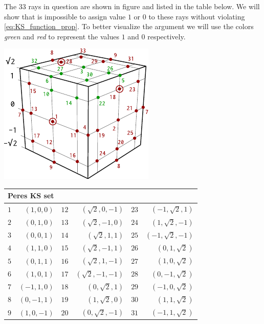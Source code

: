 \documentclass[a4paper]{article}
\theoremstyle{definition}
\let\oldproof\proof
\let\oldendproof\endproof
\renewenvironment{proof}
    {
        \begin{framed} 
        \oldproof
    }
    {
        \oldendproof 
        \end{framed}
    }
\begin{document}
\begin{proof}
    The 33 rays in question are shown in figure and listed in the table below.
    We will show that is impossible to assign value $1$ or $0$ to these rays
    without violating \eqref{eq:KS_function_prop}.
    To better visualize the argument we will use the colors \emph{green} and
    \emph{red} to represent the values $1$ and $0$ respectively.

    \begin{center}
        \includegraphics[scale=1.5]{KS33cube.pdf} \\
    \end{center}
    \begin{center}
    \begin{tabular}{lrlrlr}
        \multicolumn{2}{l}{Peres KS set} \\
        \toprule
        $1$ & $(1, 0, 0)$ & $12$ & $(\sqrt{2}, 0, -1)$ & $23$ & $(-1, \sqrt{2}, 1)$ \\ 
        $2$ & $(0, 1, 0)$ & $13$ & $(\sqrt{2}, -1, 0)$  & $24$ & $(1, \sqrt{2}, -1)$ \\
        $3$ & $(0, 0, 1)$ & $14$ & $(\sqrt{2}, 1, 1)$  & $25$ & $(-1, \sqrt{2}, -1)$ \\
        $4$ & $(1, 1, 0)$ & $15$ & $(\sqrt{2}, -1, 1)$  & $26$ & $(0, 1,\sqrt{2})$ \\
        $5$ & $(0, 1, 1)$ & $16$ & $(\sqrt{2}, 1, -1)$  & $27$ & $(1, 0, \sqrt{2})$ \\
        $6$ & $(1, 0, 1)$ & $17$ & $(\sqrt{2}, -1, -1)$  & $28$ & $(0, -1,\sqrt{2})$ \\
        $7$ & $(-1, 1, 0)$ & $18$ & $(0, \sqrt{2}, 1)$  & $29$ & $(-1, 0,\sqrt{2})$ \\
        $8$ & $(0, -1, 1)$ & $19$ & $(1, \sqrt{2}, 0)$  & $30$ & $(1,1,\sqrt{2})$ \\
        $9$ & $(1, 0, -1)$ & $20$ & $(0, \sqrt{2}, -1)$  & $31$ & $(-1, 1, \sqrt{2})$ \\

\end{tabular}
\end{center}
\end{proof}
\end{document}
